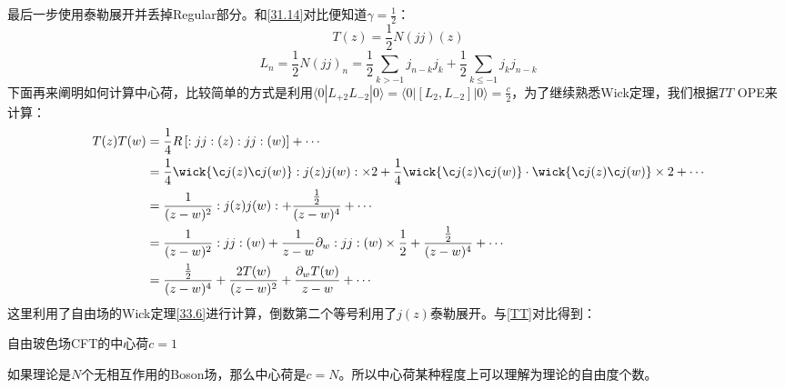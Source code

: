 最后一步使用泰勒展开并丢掉Regular部分。和\ref{31.14}对比便知道$\gamma=\frac{1}{2}$：
\begin{equation}
	\boxed{
		T(z)=\frac{1}{2}N(jj)(z)
	}
\end{equation}
\begin{equation}\label{35.14}
	L_n=\frac{1}{2}\left.N(jj)_n=\frac{1}{2}\sum_{k>-1}j_{n-k}\left.j_k+\frac{1}{2}\right.\sum_{k\leq-1}j_k\left.j_{n-k}\right.\right. 
\end{equation}
下面再来阐明如何计算中心荷，比较简单的方式是利用$\langle0|L_{+2}L_{-2}|0\rangle=\langle0|[L_2,L_{-2}]|0\rangle=\frac c2$，为了继续熟悉Wick定理，我们根据$TT$ OPE来计算：
\begin{equation}
	\begin{aligned}
		T(z)T(w)&=\frac{1}{4}R\left[:jj:(z):jj:(w)\right]+\cdots\\
		&=\frac{1}{4}\wick{\c j(z)\c j(w)}:j(z)j(w):\times 2+\frac{1}{4}\wick{\c j(z)\c j(w)}\cdot\wick{\c j(z)\c j(w)}\times 2+\cdots\\
		&=\frac{1}{(z-w)^2}:j(z)j(w):+\frac{\frac{1}{2}}{(z-w)^4}+\cdots\\
		&=\frac{1}{(z-w)^2}:jj:(w)+\frac{1}{z-w}\partial_w :jj:(w)\times\frac{1}{2}+\frac{\frac{1}{2}}{(z-w)^4}+\cdots\\
		&=\frac{\frac{1}{2}}{(z-w)^4}+\frac{2T(w)}{(z-w)^2}+\frac{\partial_w T(w)}{z-w}+\cdots
	\end{aligned}
\end{equation}
这里利用了自由场的Wick定理\ref{33.6}进行计算，倒数第二个等号利用了$j(z)$泰勒展开。与\ref{TT}对比得到：
\begin{theorem}
	自由玻色场CFT的中心荷$\boxed{c=1}$
\end{theorem}
如果理论是$N$个无相互作用的Boson场，那么中心荷是$c=N$。所以中心荷某种程度上可以理解为理论的自由度个数。
